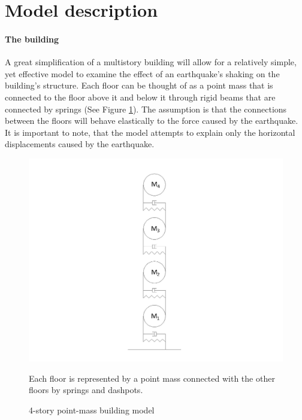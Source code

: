 \documentclass{article}
\begin{document}
	\section{Model description}

		 	\paragraph{The building} A great simplification of a multistory building will allow for a relatively simple, yet effective model to examine the effect of an earthquake's shaking on the building's structure. Each floor can be thought of as a point mass that is connected to the floor above it and below it through rigid beams that are connected by springs (See Figure \ref{fig1}). The assumption is that the connections between the floors will behave elastically to the force caused by the earthquake. It is important to note, that the model attempts to explain only the horizontal displacements caused by the earthquake.
				
				\begin{figure}[h!]
   					\centering
   					\includegraphics[width=120mm]{SPRINGS-Model1.jpg}
					\centering
   					\caption{4-story point-mass building model}
					\medskip
					\small
					Each floor is represented by a point mass connected with the other floors by springs and dashpots.
				           \label{fig1}
  				\end{figure}
\end{document}
